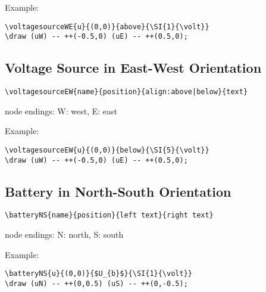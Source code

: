 \documentclass[parskip=full]{scrartcl}
\begin{document}
Example:\\
\begin{minipage}{0.8\textwidth}
\begin{verbatim}
\voltagesourceWE{u}{(0,0)}{above}{\SI{1}{\volt}}
\draw (uW) -- ++(-0.5,0) (uE) -- ++(0.5,0);
\end{verbatim}
\end{minipage}
\begin{minipage}{0.19\textwidth}
\end{minipage}

\subsection{Voltage Source in East-West Orientation}

\begin{verbatim}
\voltagesourceEW{name}{position}{align:above|below}{text}
\end{verbatim}
node endings: W: west, E: east

Example:\\
\begin{minipage}{0.8\textwidth}
\begin{verbatim}
\voltagesourceEW{u}{(0,0)}{below}{\SI{5}{\volt}}
\draw (uW) -- ++(-0.5,0) (uE) -- ++(0.5,0);
\end{verbatim}
\end{minipage}
\begin{minipage}{0.19\textwidth}
\end{minipage}

\subsection{Battery in North-South Orientation}

\begin{verbatim}
\batteryNS{name}{position}{left text}{right text}
\end{verbatim}
node endings: N: north, S: south

Example:\\
\begin{minipage}{0.8\textwidth}
\begin{verbatim}
\batteryNS{u}{(0,0)}{$U_{b}$}{\SI{1}{\volt}}
\draw (uN) -- ++(0,0.5) (uS) -- ++(0,-0.5);
\end{verbatim}
\end{minipage}
\begin{minipage}{0.19\textwidth}
\end{minipage}
\end{document}
